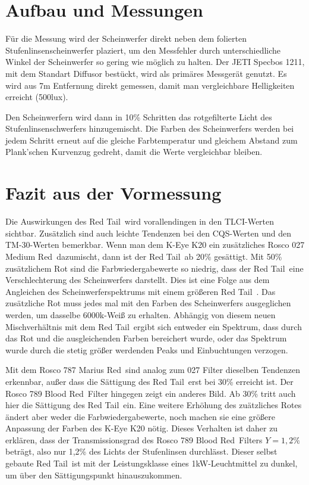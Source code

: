 \section{Aufbau und Messungen}
\label{sec_vmaum}

Für die Messung wird der Scheinwerfer direkt neben dem folierten Stufenlinsenscheinwerfer plaziert, um den Messfehler durch unterschiedliche Winkel der Scheinwerfer so gering wie möglich zu halten. Der JETI Specbos 1211, mit dem Standart Diffusor bestückt, wird als primäres Messgerät genutzt. Es wird aus 7m Entfernung direkt gemessen, damit man vergleichbare Helligkeiten erreicht (500lux). 

Den Scheinwerfern wird dann in 10\% Schritten das rotgefilterte Licht des Stufenlinsenschwerfers hinzugemischt. Die Farben des Scheinwerfers werden bei jedem Schritt erneut auf die gleiche Farbtemperatur und gleichem Abstand zum Plank'schen Kurvenzug gedreht, damit die Werte vergleichbar bleiben.


\section{Fazit aus der Vormessung}
\label{sec_vmfazit}
Die Auswirkungen des \glqq Red Tail\grqq\ wird vorallendingen in den TLCI-Werten sichtbar. Zusätzlich sind auch leichte Tendenzen bei den CQS-Werten und den TM-30-Werten bemerkbar.
Wenn man dem K-Eye K20 ein zusätzliches Rosco 027 \glqq Medium Red\grqq\ dazumischt, dann ist der \glqq Red Tail\grqq\ ab 20\% gesättigt. Mit 50\% zusätzlichem Rot sind die Farbwiedergabewerte so niedrig, dass der \glqq Red Tail\grqq\ eine Verschlechterung des Scheinwerfers darstellt. Dies ist eine Folge aus dem Angleichen des Scheinwerferspektrums mit einem größeren \glqq Red Tail\grqq\ .
Das zusätzliche Rot muss jedes mal mit den Farben des Scheinwerfers ausgeglichen werden, um dasselbe 6000k-Weiß zu erhalten. Abhängig von diesem neuen Mischverhältnis mit dem \glqq Red Tail\grqq\ ergibt sich entweder ein Spektrum, dass durch das Rot und die ausgleichenden Farben bereichert wurde, oder das Spektrum wurde durch die stetig größer werdenden Peaks und Einbuchtungen verzogen.


Mit dem Rosco 787 \glqq Marius Red\grqq\ sind analog zum 027 Filter dieselben Tendenzen erkennbar, außer dass die Sättigung des \glqq Red Tail\grqq\ erst bei 30\% erreicht ist.
Der Rosco 789 \glqq Blood Red\grqq\ Filter hingegen zeigt ein anderes Bild. Ab 30\% tritt auch hier die Sättigung des \glqq Red Tail\grqq\ ein. Eine weitere Erhöhung des zuätzliches Rotes ändert aber weder die Farbwiedergabewerte, noch machen sie eine größere Anpassung der Farben des K-Eye K20 nötig. Dieses Verhalten ist daher zu erklären, dass der Transmissionsgrad des Rosco 789 \glqq Blood Red\grqq\ Filters  $Y=1,2\%$ beträgt, also nur 1,2\% des Lichts der Stufenlinsen durchlässt. Dieser selbst gebaute \glqq Red Tail\grqq\ ist mit der Leistungsklasse eines 1kW-Leuchtmittel zu dunkel, um über den Sättigungspunkt hinauszukommen.  

